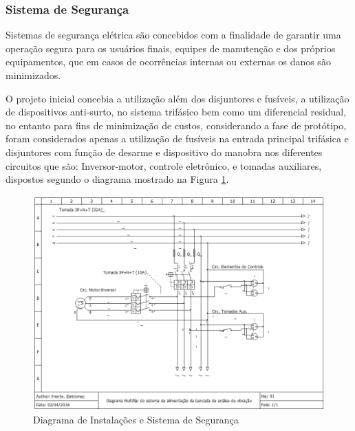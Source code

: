 \subsubsection*{Sistema de Segurança}

Sistemas de segurança elétrica são concebidos com a finalidade de garantir uma operação segura para os usuários finais, equipes de manutenção e dos próprios equipamentos, que em casos de ocorrências internas ou externas os danos são minimizados.

O projeto inicial concebia a utilização além dos disjuntores e fusíveis, a utilização de dispositivos anti-surto, no sistema trifásico bem como um diferencial residual, no entanto para fins de minimização de custos, considerando a fase de protótipo, foram considerados apenas a utilização de fusíveis na entrada principal trifásica e disjuntores com função de desarme e dispositivo do manobra nos diferentes circuitos que são: Inversor-motor, controle eletrônico, e tomadas auxiliares, dispostos segundo o diagrama mostrado na Figura \ref{Diagrama de Instalações}.

\begin{figure}[h!]
	\centering
		\includegraphics[keepaspectratio=true,scale=0.6]{figuras/Diagrama_Instalacao.png}
	\caption{Diagrama de Instalações e Sistema de Segurança}
    \label{Diagrama de Instalações}
\end{figure}